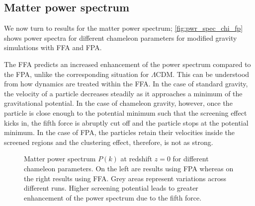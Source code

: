\subsection{Matter power spectrum}
We now turn to results for the matter power spectrum; \autoref{fig:pwr_spec_chi_fp} shows power spectra for different chameleon parameters for modified gravity simulations with FFA and FPA.

The FFA predicts an increased enhancement of the power spectrum compared to the FPA, unlike the corresponding situation for $\Lambda$CDM. This can be understood from how dynamics are treated within the FFA. In the case of standard gravity, the velocity of a particle decreases steadily as it approaches a minimum of the gravitational potential. In the case of chameleon gravity, however, once the particle is close enough to the potential minimum such that the screening effect kicks in, the fifth force is abruptly cut off and the particle stops at the potential minimum. In the case of FPA, the particles retain their velocities inside the screened regions and the clustering effect, therefore, is not as strong.

\begin{figure*}
\centering
	\chileft
	\begin{subfigure}{1.2\textwidth}
	\end{subfigure}
	\begin{subfigure}{0.5\textwidth}
	\end{subfigure}%
	\begin{subfigure}{0.5\textwidth}
	\end{subfigure}
	\begin{subfigure}{0.5\textwidth}
	\end{subfigure}%
	\begin{subfigure}{0.5\textwidth}
	\end{subfigure}
    \caption{Matter power spectrum $P(k)$ at redshift $z=0$ for different chameleon parameters. On the left are results using FPA whereas on the right results using FFA. Grey areas represent variations across different runs. Higher screening potential leads to greater enhancement of the power spectrum due to the fifth force.}
    \label{fig:pwr_spec_chi_fp}
\end{figure*}

